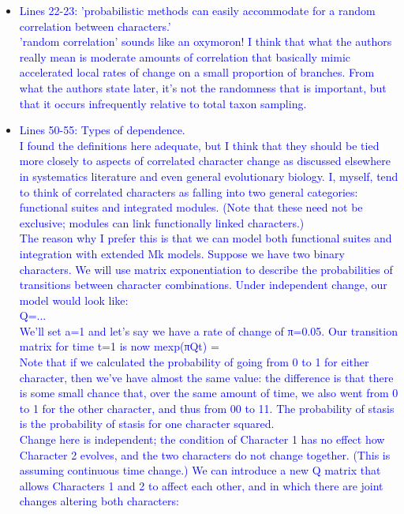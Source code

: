 \documentclass[12pt,letterpaper]{article}
\begin{document}
\begin{itemize}

\item{\textcolor{blue}{Lines 22-23: 'probabilistic methods can easily accommodate for a random correlation between characters.'
\\
'random correlation' sounds like an oxymoron! I think that what the authors really mean is moderate amounts of correlation that basically mimic accelerated local rates of change on a small proportion of branches. From what the authors state later, it’s not the randomness that is important, but that it occurs infrequently relative to total taxon sampling.}}

\item{\textcolor{blue}{Lines 50-55: Types of dependence.
\\
I found the definitions here adequate, but I think that they should be tied more closely to aspects of correlated character change as discussed elsewhere in systematics literature and even general evolutionary biology. I, myself, tend to think of correlated characters as falling into two general categories: functional suites and integrated modules. (Note that these need not be exclusive; modules can link functionally linked characters.)
\\
The reason why I prefer this is that we can model both functional suites and integration with extended Mk models. Suppose we have two binary characters. We will use matrix exponentiation to describe the probabilities of transitions between character combinations. Under independent change, our model would look like:
\\
Q=...
\\
We’ll set a=1 and let’s say we have a rate of change of π=0.05. Our transition matrix for time t=1 is now mexp(πQt) =
\\
Note that if we calculated the probability of going from 0 to 1 for either character, then we’ve have almost the same value: the difference is that there is some small chance that, over the same amount of time, we also went from 0 to 1 for the other character, and thus from 00 to 11. The probability of stasis is the probability of stasis for one character squared.
\\
Change here is independent; the condition of Character 1 has no effect how Character 2 evolves, and the two characters do not change together. (This is assuming continuous time change.) We can introduce a new Q matrix that allows Characters 1 and 2 to affect each other, and in which there are joint changes altering both characters:
}}
\end{itemize}
\end{document}
